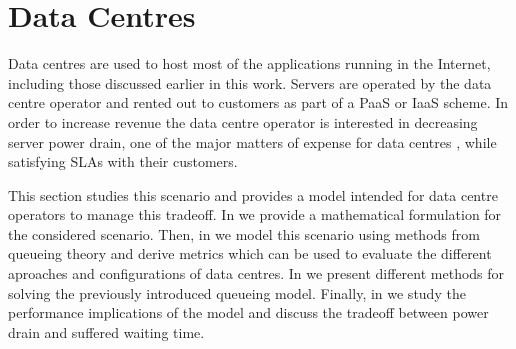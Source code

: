 \section{Data Centres}\label{sec:cloud:data_centers}
Data centres are used to host most of the applications running in the Internet, including those discussed earlier in this work.
Servers are operated by the data centre operator and rented out to customers as part of a \gls{PaaS} or \gls{IaaS} scheme.
In order to increase revenue the data centre operator is interested in decreasing server power drain, one of the major matters of expense for data centres \cite{Greenberg2009b}, while satisfying \glspl{SLA} with their customers.

This section studies this scenario and provides a model intended for data centre operators to manage this tradeoff.
In  we provide a mathematical formulation for the considered scenario.
Then, in  we model this scenario using methods from queueing theory and derive metrics which can be used to evaluate the different aproaches and configurations of data centres.
In  we present different methods for solving the previously introduced queueing model.
Finally, in  we study the performance implications of the model and discuss the tradeoff between power drain and suffered waiting time.




